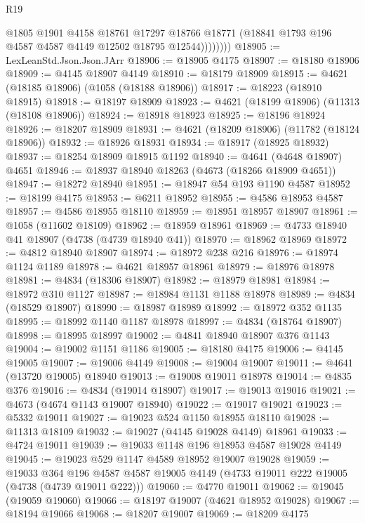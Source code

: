\begin{lexlean}{R19}
\begin{coremodule}
                  @1805
                  @1901
                  @4158
                  @18761
                  @17297
                  @18766
                  @18771
                  (@18841 @1793 @196 @4587 @4587 @4149 @12502 @18795 @12544))))))))
@18905 := LexLeanStd.Json.Json.JArr
@18906 := @18905 @4175
@18907 := @18180 @18906
@18909 := @4145 @18907 @4149
@18910 := @18179 @18909
@18915 := @4621 (@18185 @18906) (@1058 (@18188 @18906))
@18917 := @18223 (@18910 @18915)
@18918 := @18197 @18909
@18923 := @4621 (@18199 @18906) (@11313 (@18108 @18906))
@18924 := @18918 @18923
@18925 := @18196 @18924
@18926 := @18207 @18909
@18931 := @4621 (@18209 @18906) (@11782 (@18124 @18906))
@18932 := @18926 @18931
@18934 := @18917 (@18925 @18932)
@18937 := @18254 @18909 @18915 @1192
@18940 := @4641 (@4648 @18907) @4651
@18946 := @18937 @18940 @18263 (@4673 (@18266 @18909 @4651))
@18947 := @18272 @18940
@18951 := @18947 @54 @193 @1190 @4587
@18952 := @18199 @4175
@18953 := @6211 @18952
@18955 := @4586 @18953 @4587
@18957 := @4586 @18955 @18110
@18959 := @18951 @18957 @18907
@18961 := @1058 (@11602 @18109)
@18962 := @18959 @18961
@18969 := @4733 @18940 @41 @18907 (@4738 (@4739 @18940 @41))
@18970 := @18962 @18969
@18972 := @4812 @18940 @18907
@18974 := @18972 @238 @216
@18976 := @18974 @1124 @1189
@18978 := @4621 @18957 @18961
@18979 := @18976 @18978
@18981 := @4834 (@18306 @18907)
@18982 := @18979 @18981
@18984 := @18972 @310 @1127
@18987 := @18984 @1131 @1188 @18978
@18989 := @4834 (@18529 @18907)
@18990 := @18987 @18989
@18992 := @18972 @352 @1135
@18995 := @18992 @1140 @1187 @18978
@18997 := @4834 (@18764 @18907)
@18998 := @18995 @18997
@19002 := @4841 @18940 @18907 @376 @1143
@19004 := @19002 @1151 @1186
@19005 := @18180 @4175
@19006 := @4145 @19005
@19007 := @19006 @4149
@19008 := @19004 @19007
@19011 := @4641 (@13720 @19005) @18940
@19013 := @19008 @19011 @18978
@19014 := @4835 @376
@19016 := @4834 (@19014 @18907)
@19017 := @19013 @19016
@19021 := @4673 (@4674 @1143 @19007 @18940)
@19022 := @19017 @19021
@19023 := @5332 @19011
@19027 := @19023 @524 @1150 @18955 @18110
@19028 := @11313 @18109
@19032 := @19027 (@4145 @19028 @4149) @18961
@19033 := @4724 @19011
@19039 := @19033 @1148 @196 @18953 @4587 @19028 @4149
@19045 := @19023 @529 @1147 @4589 @18952 @19007 @19028
@19059 := @19033
    @364
    @196
    @4587
    @4587
    @19005
    @4149
    (@4733 @19011 @222 @19005 (@4738 (@4739 @19011 @222)))
@19060 := @4770 @19011
@19062 := @19045 (@19059 @19060)
@19066 := @18197 @19007 (@4621 @18952 @19028)
@19067 := @18194 @19066
@19068 := @18207 @19007
@19069 := @18209 @4175

\end{coremodule}
\end{lexlean}

